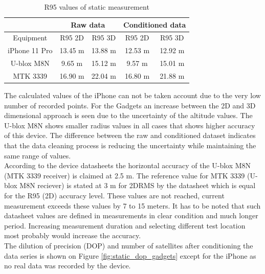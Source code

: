 \documentclass{article}
\begin{document}
			\begin{table}[h]
				\centering
				\begin{tabular}{|c|c|c|c|c|}
					\hline 
					& \multicolumn{2}{c|}{Raw data} & \multicolumn{2}{c|}{Conditioned data} \\ 
					\hline 
					Equipment & R95 2D & R95 3D & R95 2D & R95 3D \\ 
					\hline 
					iPhone 11 Pro & 13.45 m & 13.88 m & 12.53 m & 12.92 m \\ 
					\hline 
					U-blox M8N & 9.65 m & 15.12 m & 9.57 m & 15.01 m \\ 
					\hline 
					MTK 3339 & 16.90 m & 22.04 m & 16.80 m & 21.88 m \\ 
					\hline 
				\end{tabular} 
			\caption{R95 values of static measurement}
			\label{table:static_results}
			\end{table}
			The calculated values of the iPhone can not be taken account due to the very low number of recorded points. For the Gadgets an increase between the 2D and 3D dimensional approach is seen due to the uncertainty of the altitude values. The U-blox M8N shows smaller radius values in all cases that shows higher accuracy of this device. The difference between the raw and conditioned dataset indicates that the data cleaning process is reducing the uncertainty while maintaining the same range of values. \\
			According to the device datasheets the horizontal accuracy of the U-blox M8N (MTK 3339 receiver) is claimed at 2.5 m. The reference value for MTK 3339 (U-blox M8N reciever) is stated at 3 m for 2DRMS by the datasheet which is equal for the R95 (2D) accuracy level. These values are not reached, current measurement exceeds these values by 7 to 15 meters. It has to be noted that such datasheet values are defined in measurements in clear condition and much longer period. Increasing measurement duration and selecting different test location most probably would increase the accuracy.\\
			The dilution of precision (DOP) and number of satellites after conditioning the data series is shown on Figure \ref{fig:static_dop_gadgets} except for the iPhone as no real data was recorded by the device.
\end{document}
